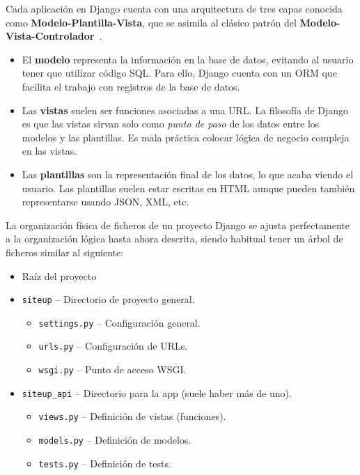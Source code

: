 Cada aplicación en Django cuenta con una arquitectura de tres capas conocida
como \textbf{Modelo-Plantilla-Vista}, que se asimila al clásico patrón del
\textbf{Modelo-Vista-Controlador}~\cite{django:mvc}.

\begin{itemize}
\item El \textbf{modelo} representa la información en la base de datos, evitando
  al usuario tener que utilizar código SQL. Para ello, Django cuenta con un
  \ac{ORM} que facilita el trabajo con registros de la base de datos.
\item Las \textbf{vistas} suelen ser funciones asociadas a una URL. La filosofía
  de Django es que las vistas sirvan solo como \textit{punto de paso} de los
  datos entre los modelos y las plantillas. Es mala práctica colocar lógica de
  negocio compleja en las vistas.
\item Las \textbf{plantillas} son la representación final de los datos, lo que
  acaba viendo el usuario. Las plantillas suelen estar escritas en HTML aunque
  pueden también representarse usando JSON, XML, etc.
\end{itemize}

La organización física de ficheros de un proyecto Django se ajusta perfectamente
a la organización lógica hasta ahora descrita, siendo habitual tener un árbol de
ficheros similar al siguiente:

\begin{itemize}
\item Raíz del proyecto
\item \texttt{siteup} --  Directorio de proyecto general.
  \begin{itemize}
  \item \texttt{settings.py} -- Configuración general.
  \item \texttt{urls.py} -- Configuración de URLs.
  \item \texttt{wsgi.py} -- Punto de acceso WSGI.
  \end{itemize}
\item \texttt{siteup\_api} --  Directorio para la app (suele haber más de uno).
  \begin{itemize}
  \item \texttt{views.py} -- Definición de vistas (funciones).
  \item \texttt{models.py} -- Definición de modelos.
  \item \texttt{tests.py} -- Definición de tests.
  \end{itemize}
\end{itemize}

